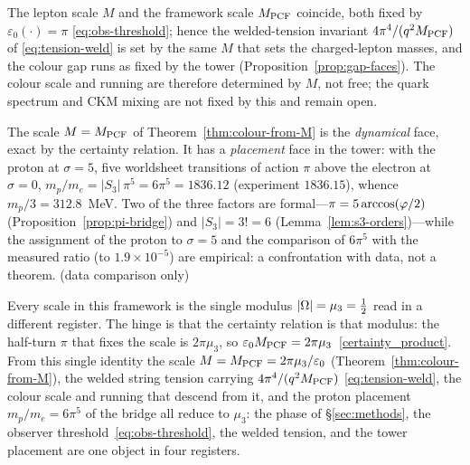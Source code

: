 \begin{theorem}\label{thm:colour-from-M}
The lepton scale $M$ and the framework scale $M_{\mathrm{PCF}}$ coincide, both fixed by $\varepsilon_0(\cdot)=\pi$ \eqref{eq:obs-threshold}; hence the welded-tension invariant $4\pi^4/(q^2M_{\mathrm{PCF}})$ of \eqref{eq:tension-weld} is set by the same $M$ that sets the charged-lepton masses, and the colour gap runs as fixed by the tower (Proposition~\ref{prop:gap-faces}). The colour scale and running are therefore determined by $M$, not free; the quark spectrum and CKM mixing are not fixed by this and remain open.

\end{theorem}

\begin{remark}\label{rmk:M-two-faces}
The scale $M=M_{\mathrm{PCF}}$ of Theorem~\ref{thm:colour-from-M} is the \emph{dynamical} face, exact by the certainty relation. It has a \emph{placement} face in the tower: with the proton at $\sigma=5$, five worldsheet transitions of action $\pi$ above the electron at $\sigma=0$, $m_p/m_e=\lvert S_3\rvert\,\pi^5=6\pi^5=1836.12$ (experiment $1836.15$), whence $m_p/3=312.8$~MeV. Two of the three factors are formal---$\pi=5\arccos(\varphi/2)$ (Proposition~\ref{prop:pi-bridge}) and $\lvert S_3\rvert=3!=6$ (Lemma~\ref{lem:s3-orders})---while the assignment of the proton to $\sigma=5$ and the comparison of $6\pi^5$ with the measured ratio (to $1.9\times10^{-5}$) are empirical: a confrontation with data, not a theorem.
(data comparison only) 
\end{remark}

\begin{theorem}\label{thm:one-object}
Every scale in this framework is the single modulus $\lvert\Omega\rvert=\mu_3=\tfrac12$ read in a different register. The hinge is that the certainty relation is that modulus: the half-turn $\pi$ that fixes the scale is $2\pi\mu_3$, so $\varepsilon_0M_{\mathrm{PCF}}=2\pi\mu_3$~\eqref{certainty_product}. From this single identity the scale $M=M_{\mathrm{PCF}}=2\pi\mu_3/\varepsilon_0$ (Theorem~\ref{thm:colour-from-M}), the welded string tension carrying $4\pi^4/(q^2M_{\mathrm{PCF}})$ \eqref{eq:tension-weld}, the colour scale and running that descend from it, and the proton placement $m_p/m_e=6\pi^5$ of the bridge all reduce to $\mu_3$: the phase of \S\ref{sec:methods}, the observer threshold~\eqref{eq:obs-threshold}, the welded tension, and the tower placement are one object in four registers.

\end{theorem}

